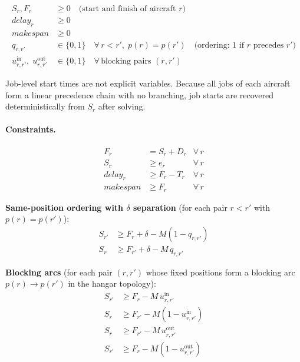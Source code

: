 \begin{align*}
S_r, F_r &\geq 0 \quad \text{(start and finish of aircraft } r\text{)} \\
\mathit{delay}_r &\geq 0 \\
\mathit{makespan} &\geq 0 \\
q_{r,r'} &\in \{0,1\} \quad \forall\, r < r',\; p(r)=p(r') \quad
    \text{(ordering: 1 if } r \text{ precedes } r'\text{)} \\
u^{\mathrm{in}}_{r,r'},\; u^{\mathrm{out}}_{r,r'} &\in \{0,1\} \quad
    \forall\, \text{blocking pairs } (r,r')
\end{align*}

Job-level start times are not explicit variables.  Because all jobs of
each aircraft form a linear precedence chain with no branching, job
starts are recovered deterministically from $S_r$ after solving.

\paragraph{Constraints.}

\begin{align}
F_r &= S_r + D_r & \forall\, r \label{fas:finish} \\
S_r &\geq e_r & \forall\, r \label{fas:earliest} \\
\mathit{delay}_r &\geq F_r - T_r & \forall\, r \label{fas:delay} \\
\mathit{makespan} &\geq F_r & \forall\, r \label{fas:makespan}
\end{align}

\noindent\textbf{Same-position ordering with $\delta$ separation}
(for each pair $r < r'$ with $p(r) = p(r')$):
\begin{align}
S_{r'} &\geq F_r + \delta - M(1 - q_{r,r'}) \label{fas:order1} \\
S_r    &\geq F_{r'} + \delta - M\, q_{r,r'}  \label{fas:order2}
\end{align}

\noindent\textbf{Blocking arcs} (for each pair $(r,r')$ whose fixed positions
form a blocking arc $p(r) \to p(r')$ in the hangar topology):
\begin{align}
S_{r'} &\geq F_r - M\, u^{\mathrm{in}}_{r,r'} \label{fas:bin1} \\
S_r    &\geq F_{r'} - M(1 - u^{\mathrm{in}}_{r,r'}) \label{fas:bin2} \\
S_r    &\geq F_{r'} - M\, u^{\mathrm{out}}_{r,r'} \label{fas:bout1} \\
S_{r'} &\geq F_r - M(1 - u^{\mathrm{out}}_{r,r'}) \label{fas:bout2}
\end{align}

